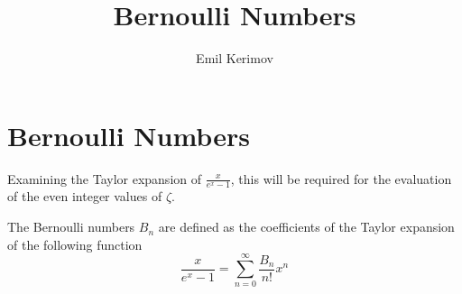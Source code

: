 \documentclass[a4paper]{article}
\title{Bernoulli Numbers}
\author{Emil Kerimov}
\date{}
\begin{document}
\maketitle

\section{Bernoulli Numbers}\label{bn:sec:bernoulli-numbers}
Examining the Taylor expansion of $\frac{x}{e^x -1}$, this will be required for the evaluation of the even integer values of $\zeta.$

\begin{definition}
    \label{bn:bernoulli-def}
    The Bernoulli numbers $B_n$ are defined as the coefficients of the Taylor expansion of the following function
    \[\boxed{
            \frac{x}{e^x -1} = \sum_{n=0}^{\infty} \frac{B_n}{n!} x^n
        }
    \]
\end{definition}
\end{document}
